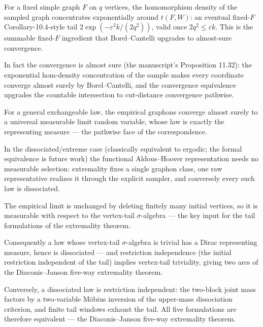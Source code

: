 
For a fixed simple graph $F$ on $q$ vertices, the homomorphism density of the sampled
graph concentrates exponentially around $t(F,W)$: an eventual fixed-$F$
Corollary-10.4-style tail $2\exp(-\varepsilon^2 k/(2q^2))$, valid once
$2q^2 \le \varepsilon k$. This is the summable fixed-$F$ ingredient that
Borel--Cantelli upgrades to almost-sure convergence.


In fact the convergence is almost sure (the manuscript's Proposition 11.32): the
exponential hom-density concentration of the sample makes every coordinate converge
almost surely by Borel--Cantelli, and the convergence equivalence upgrades the
countable intersection to cut-distance convergence pathwise.


For a general exchangeable law, the empirical graphons converge almost surely to a
universal measurable limit random variable, whose law is exactly the representing
measure — the pathwise face of the correspondence.


In the dissociated/extreme case (classically equivalent to ergodic; the formal
equivalence is future work) the functional Aldous--Hoover representation needs no
measurable selection: extremality fixes a single graphon class, one raw representative
realizes it through the explicit sampler, and conversely every such law is dissociated.


The empirical limit is unchanged by deleting finitely many initial vertices, so it is
measurable with respect to the vertex-tail $\sigma$-algebra --- the key input for the
tail formulations of the extremality theorem.


Consequently a law whose vertex-tail $\sigma$-algebra is trivial has a Dirac
representing measure, hence is dissociated --- and restriction independence (the initial
restriction independent of the tail) implies vertex-tail triviality, giving two arcs of
the Diaconis--Janson five-way extremality theorem.


Conversely, a dissociated law is restriction independent: the two-block joint mass
factors by a two-variable M\"obius inversion of the upper-mass dissociation criterion,
and finite tail windows exhaust the tail. All five formulations are therefore
equivalent --- the Diaconis--Janson five-way extremality theorem.

